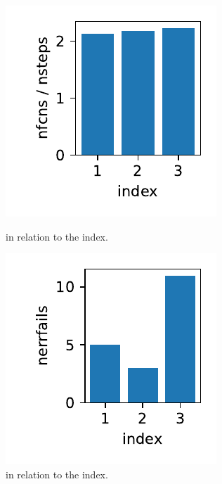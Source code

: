 \documentclass{report}
\begin{document}
\begin{figure}[h]
\begin{minipage}[t]{0.3\textwidth}
\includegraphics[width=\textwidth]{../Plots/Project2_main/Figure_610}
\caption{ in relation to the index.}
\label{pl:nfcns_nsteps_indx123}
\end{minipage}
\hfill
\begin{minipage}[t]{0.3\textwidth}
\centering
\includegraphics[width=\textwidth]{../Plots/Project2_main/Figure_603}
\caption{ in relation to the index.}
\label{pl:nerrfails_indx123}
\end{minipage}
\end{figure}
\end{document}
